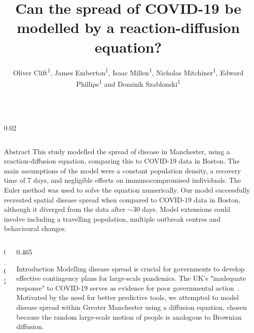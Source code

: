 \documentclass{beamer} %
\title{\huge Can the spread of COVID-19 be modelled by a reaction-diffusion equation?} %
\author{Oliver Clift\textsuperscript{1}, James Emberton\textsuperscript{1}, Isaac Millen\textsuperscript{1}, Nicholas Mitchiner\textsuperscript{1}, Edward Phillips\textsuperscript{1} and Dominik Szablonski\textsuperscript{1}} %
\institute{\textsuperscript{1}Department of Physics, University of Manchester} %
\begin{document}
	
\begin{frame}[t] %

\begin{columns}[t] %

\begin{column}{0.02\textwidth}\end{column} %

\end{columns}

\hspace{0.015\textwidth}%
\begin{minipage}{0.97\textwidth}
\begin{block}{Abstract}
This study modelled the spread of disease in Manchester, using a reaction-diffusion equation, comparing this to COVID-19 data in Boston. The main assumptions of the model were a constant population density, a recovery time of 7 days, and negligible effects on immunocompromised individuals. The Euler method was used to solve the equation numerically. Our model successfully recreated spatial disease spread when compared to COVID-19 data in Boston, although it diverged from the data after $\sim$30 days. Model extensions could involve including a travelling population, multiple outbreak centres and behavioural changes.
\end{block}
\end{minipage}

\begin{columns}[t]
\begin{column}{0.02\textwidth}\end{column}

\begin{column}{0.465\textwidth} %


            
\begin{block}{Introduction}
	Modelling disease spread is crucial for governments to develop effective contingency plans for large-scale pandemics. The UK's "inadequate response" to COVID-19 serves as evidence for poor governmental action~\cite{Frowde2020FailPrepare}. Motivated by the need for better predictive tools, we attempted to model disease spread within Greater Manchester using a diffusion equation, chosen because the random large-scale motion of people is analogous to Brownian diffusion.
	

\end{block}
\end{column}
\end{columns}
\end{frame}
\end{document}
